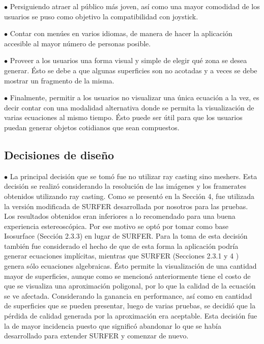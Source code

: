 \documentclass[12pt]{article}
\begin{document}
$\bullet$ Persiguiendo atraer al público más joven, así como una mayor comodidad de los usuarios se puso como objetivo la compatibilidad con joystick.

$\bullet$ Contar con menúes en varios idiomas, de manera de hacer la aplicación accesible al mayor número de personas posible.

$\bullet$  Proveer a los usuarios una forma visual y simple de elegir qué zona se desea generar. Ésto se debe a que algunas superficies son no acotadas y a veces se debe mostrar un fragmento de la misma.

$\bullet$ Finalmente, permitir a los usuarios no visualizar una única ecuación a la vez, es decir contar con una modalidad alternativa donde se permita la visualización de varias ecuaciones al mismo tiempo. Ésto puede ser útil para que los usuarios puedan generar objetos cotidianos que sean compuestos.

\subsection{Decisiones de diseño}

$\bullet$ La principal decisión que se tomó fue no utilizar ray casting sino meshers. Esta decisión se realizó considerando la resolución de las imágenes y los framerates obtenidos utilizando ray casting. Como se presentó en la Sección 4, fue utilizada la versión modificada de SURFER desarrollada por nosotros para las pruebas. Los resultados obtenidos eran inferiores a lo recomendado para una buena experiencia estereoscópica. Por ese motivo se optó por tomar como base Isosurface (Sección 2.3.3) en lugar de SURFER. Para la toma de esta decisión también fue considerado el hecho de que de esta forma la aplicación podría generar ecuaciones implícitas, mientras que SURFER (Secciones 2.3.1 y 4 ) genera sólo ecuaciones algebraicas. Ésto permite la visualización de una cantidad mayor de superficies, aunque como se mencionó anteriormente tiene el costo de que se visualiza una aproximación poligonal, por lo que la calidad de la ecuación se ve afectada. Considerando la ganancia en performance, así como en cantidad de superficies que se pueden presentar, luego de varias pruebas, se decidió que la pérdida de calidad generada por la aproximación era aceptable. Esta decisión fue la de mayor incidencia puesto que significó abandonar lo que se había desarrollado para extender SURFER y comenzar de nuevo.
\end{document}
